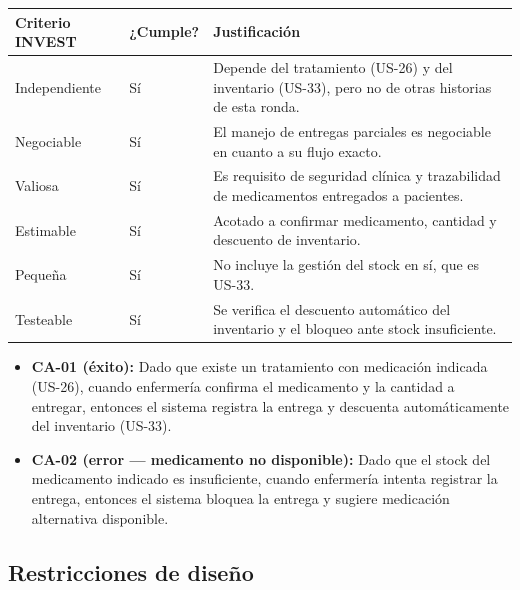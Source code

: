 \documentclass[11pt,a4paper]{article}
\providecommand{\tightlist}{%
	\setlength{\itemsep}{0pt}\setlength{\parskip}{0pt}}
\begin{document}
	\begin{longtable}{p{} p{} p{}}
		
		\toprule
		\textbf{Criterio INVEST} & \textbf{¿Cumple?} & \textbf{Justificación} \\
		\midrule
		\endhead
		
		Independiente & Sí & Depende del tratamiento (US-26) y del inventario (US-33), pero no de otras historias de esta ronda. \\
		Negociable & Sí & El manejo de entregas parciales es negociable en cuanto a su flujo exacto. \\
		Valiosa & Sí & Es requisito de seguridad clínica y trazabilidad de medicamentos entregados a pacientes. \\
		Estimable & Sí & Acotado a confirmar medicamento, cantidad y descuento de inventario. \\
		Pequeña & Sí & No incluye la gestión del stock en sí, que es US-33. \\
		Testeable & Sí & Se verifica el descuento automático del inventario y el bloqueo ante stock insuficiente. \\
		
		\bottomrule
	\end{longtable}
	
	\begin{itemize}
		\tightlist
		\item \textbf{CA-01 (éxito):} Dado que existe un tratamiento con medicación indicada (US-26), cuando enfermería confirma el medicamento y la cantidad a entregar, entonces el sistema registra la entrega y descuenta automáticamente del inventario (US-33).
		\item \textbf{CA-02 (error --- medicamento no disponible):} Dado que el stock del medicamento indicado es insuficiente, cuando enfermería intenta registrar la entrega, entonces el sistema bloquea la entrega y sugiere medicación alternativa disponible.
	\end{itemize}
	
	\subsection{ Restricciones de diseño}
	
\end{document}
